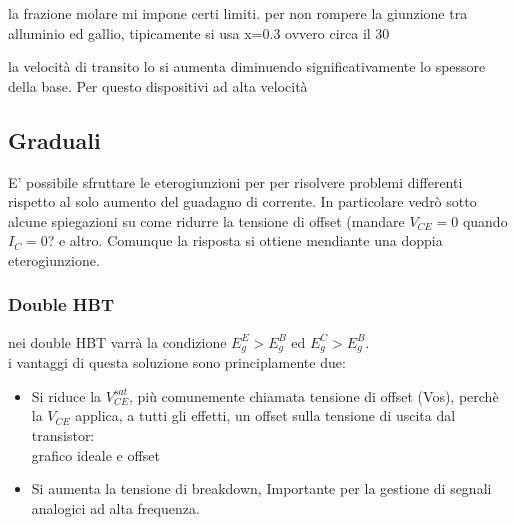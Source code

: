la frazione molare mi impone certi limiti. per non rompere la giunzione tra alluminio ed gallio, tipicamente si usa x=0.3 ovvero circa il 30%

la velocità di transito lo si aumenta diminuendo significativamente lo spessore della base.
Per questo dispositivi ad alta velocità


\cleardoublepage
\subsection{Graduali}
E' possibile sfruttare le eterogiunzioni per per risolvere problemi differenti rispetto al solo aumento del guadagno di corrente.
In particolare vedrò sotto alcune spiegazioni su come ridurre la tensione di offset (mandare $V_{CE}=0$ quando $I_C=0$? e altro.
Comunque la risposta si ottiene mendiante una doppia eterogiunzione.

\subsubsection{Double HBT}
nei double HBT varrà la condizione $E_g^E > E_g^B$ ed $E_g^C > E_g^B$. \\
i vantaggi di questa soluzione sono principlamente due:
%
\begin{itemize}
    \item Si riduce la $V_{CE}^{sat}$, più comunemente chiamata tensione di offset (Vos),  perchè la $V_{CE}$ applica, a tutti gli effetti, un offset sulla tensione di uscita dal transistor: \\
    
    grafico ideale e offset

    \item Si aumenta la tensione di breakdown, Importante per la gestione di segnali analogici ad alta frequenza.
\end{itemize}

